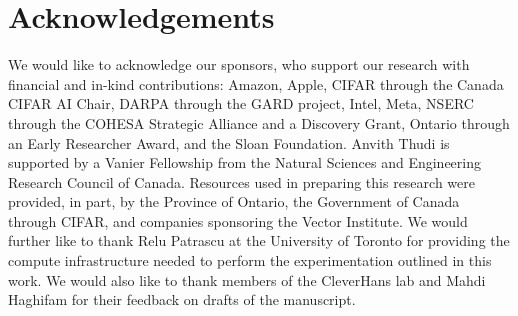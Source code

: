 \documentclass{article}
\theoremstyle{plain}
\theoremstyle{definition}
\theoremstyle{remark}
\begin{document}







\section*{Acknowledgements}
We would like to acknowledge our sponsors, who support our research with financial and in-kind contributions: Amazon, Apple, CIFAR through the Canada CIFAR AI Chair, DARPA through the GARD project, Intel, Meta, NSERC through the COHESA Strategic Alliance and a Discovery Grant, Ontario through an Early Researcher Award, and the Sloan Foundation. Anvith Thudi is supported by a Vanier Fellowship from the Natural Sciences and Engineering Research Council of Canada.  Resources used in preparing this research were provided, in part, by the Province of Ontario, the Government of Canada through CIFAR, and companies sponsoring the Vector Institute. We would further like to thank Relu Patrascu at the University of Toronto for providing the compute infrastructure needed to perform the experimentation outlined in this work. We would also like to thank members of the CleverHans lab and Mahdi Haghifam for their feedback on drafts of the manuscript.





\appendix
\newpage


\end{document}
